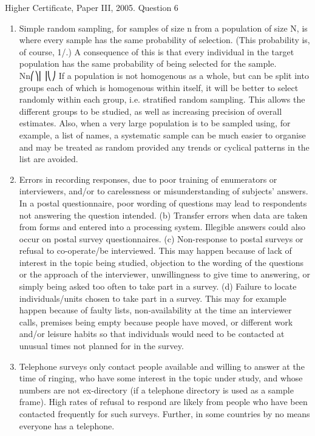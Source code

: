 \documentclass[a4paper,12pt]{article}
\begin{document}
Higher Certificate, Paper III, 2005. Question 6
\begin{enumerate}
    \item  Simple random sampling, for samples of size n from a population of size N, is where every sample has the same probability of selection. (This probability is, of course, 1/.) A consequence of this is that every individual in the target population has the same probability of being selected for the sample. Nn⎛⎞⎜⎟⎝⎠
If a population is not homogenous as a whole, but can be split into groups each of which is homogenous within itself, it will be better to select randomly within each group, i.e. stratified random sampling. This allows the different groups to be studied, as well as increasing precision of overall estimates. Also, when a very large population is to be sampled using, for example, a list of names, a systematic sample can be much easier to organise and may be treated as random provided any trends or cyclical patterns in the list are avoided.
\item Errors in recording responses, due to poor training of enumerators or interviewers, and/or to carelessness or misunderstanding of subjects' answers. In a postal questionnaire, poor wording of questions may lead to respondents not answering the question intended.
(b) Transfer errors when data are taken from forms and entered into a processing system. Illegible answers could also occur on postal survey questionnaires.
(c) Non-response to postal surveys or refusal to co-operate/be interviewed. This may happen because of lack of interest in the topic being studied, objection to the wording of the questions or the approach of the interviewer, unwillingness to give time to answering, or simply being asked too often to take part in a survey.
(d) Failure to locate individuals/units chosen to take part in a survey. This may for example happen because of faulty lists, non-availability at the time an interviewer calls, premises being empty because people have moved, or different work and/or leisure habits so that individuals would need to be contacted at unusual times not planned for in the survey.
\item Telephone surveys only contact people available and willing to answer at the time of ringing, who have some interest in the topic under study, and whose numbers are not ex-directory (if a telephone directory is used as a sample frame). High rates of refusal to respond are likely from people who have been contacted frequently for such surveys. Further, in some countries by no means everyone has a telephone.

\end{enumerate}
\end{document}
